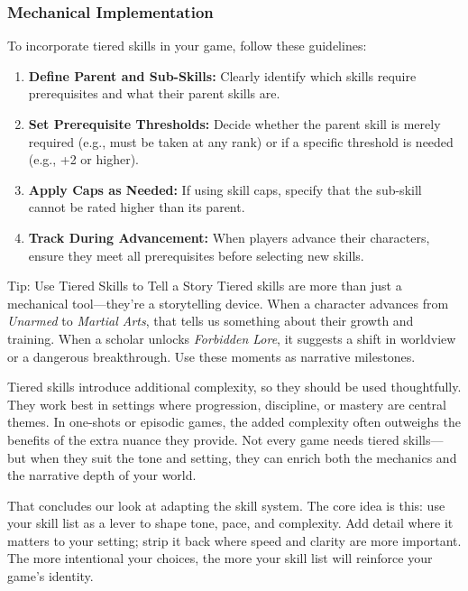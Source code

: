 \subsubsection*{Mechanical Implementation}

To incorporate tiered skills in your game, follow these guidelines:

\begin{enumerate}
    \item \textbf{Define Parent and Sub-Skills:} Clearly identify which skills require prerequisites and what their parent skills are.
    \item \textbf{Set Prerequisite Thresholds:} Decide whether the parent skill is merely required (e.g., must be taken at any rank) or if a specific threshold is needed (e.g., +2 or higher).
    \item \textbf{Apply Caps as Needed:} If using skill caps, specify that the sub-skill cannot be rated higher than its parent.
    \item \textbf{Track During Advancement:} When players advance their characters, ensure they meet all prerequisites before selecting new skills.
\end{enumerate}



\begin{CommentBox}{Tip: Use Tiered Skills to Tell a Story}
Tiered skills are more than just a mechanical tool—they're a storytelling device. When a character advances from \textit{Unarmed} to \textit{Martial Arts}, that tells us something about their growth and training. When a scholar unlocks \textit{Forbidden Lore}, it suggests a shift in worldview or a dangerous breakthrough. Use these moments as narrative milestones.
\end{CommentBox}

Tiered skills introduce additional complexity, so they should be used thoughtfully. They work best in settings where progression, discipline, or mastery are central themes. In one-shots or episodic games, the added complexity often outweighs the benefits of the extra nuance they provide. Not every game needs tiered skills—but when they suit the tone and setting, they can enrich both the mechanics and the narrative depth of your world.


\vspace{1\baselineskip}
That concludes our look at adapting the skill system. The core idea is this: use your skill list as a lever to shape tone, pace, and complexity. Add detail where it matters to your setting; strip it back where speed and clarity are more important. The more intentional your choices, the more your skill list will reinforce your game’s identity.


